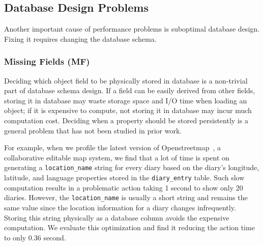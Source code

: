 \subsection{Database Design Problems}
\label{causes:db}

Another important cause of performance problems is suboptimal database design. Fixing it requires changing the database schema.
\vspace{-0.08in} 
\subsubsection{Missing Fields (MF)}
\label{sec:addfield}
Deciding which object field to be physically stored in database is a non-trivial part of database schema design. %
If a field can be easily derived from other fields, storing it in database may waste storage space and I/O time when loading an object; if it is expensive to compute, not storing it in database may incur much computation cost. Deciding when a property should be stored persistently is a general problem that has not been studied in prior work.


For example, when we profile the latest version of Openstreetmap~\cite{openstreetmap}, a collaborative editable map system, 
we find that a lot of time is spent on generating a \texttt{location\_name} string for every diary based on the diary's longitude, latitude, and language properties stored in the \texttt{diary\_entry} table. Such slow computation results in a problematic action taking 1 second to show only 20 diaries.
However, the \texttt{location\_name} is usually a short string and remains the same value since the location information for a diary changes infrequently. Storing this string physically as a database column avoids the expensive computation. We evaluate this optimization and find it reducing the action time to only 0.36 second.

